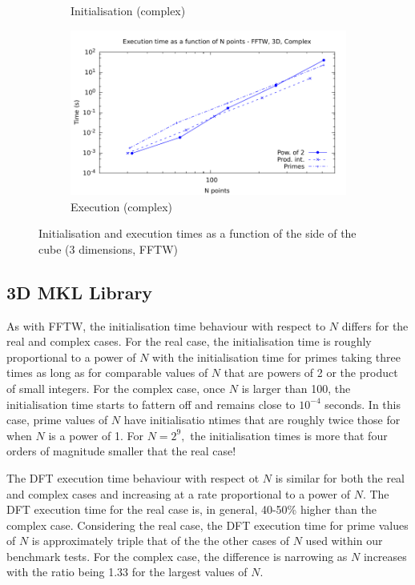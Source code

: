 \documentclass[12pt, a4paper]{article} \setlength{\textheight}{24cm}
\begin{document}
\begin{figure}[H]
\begin{subfigure}{.5\textwidth}
    \caption{Initialisation (complex)}
    \label{3DFFTWCI}
  \end{subfigure}%
  \begin{subfigure}{.5\textwidth}
    \centering
    \includegraphics[width=.9\linewidth]{graphs/3d-fftw-exec-c.pdf}
    \caption{Execution (complex)}
    \label{3DFFTWC}
  \end{subfigure}
  \caption{Initialisation and execution times as a function of the
    side of the cube (3 dimensions, FFTW)}
  \label{3DFFTW}
\end{figure}


\subsection{3D MKL Library}
As with FFTW, the initialisation time behaviour with respect to $N$
differs for the real and complex cases. For the real case, the
initialisation time is roughly proportional to a power of $N$ with the
initialisation time for primes taking three times as long as for
comparable values of $N$ that are powers of 2 or the product of small
integers. For the complex case, once $N$ is larger than 100, the
initialisation time starts to fattern off and remains close to
$10^{-4}$ seconds. In this case, prime values of $N$ have
initialisatio ntimes that are roughly twice those for when $N$ is a
power of 1. For $N=2^9,$ the initialisation times is more that four
orders of magnitude smaller that the real case!

The DFT execution time behaviour with respect ot $N$ is similar for both the real and complex cases and increasing at a rate proportional to a power of $N.$ The DFT execution time for the real case is, in general, 40-50\% higher than the complex case. Considering the real case, the DFT execution time for prime values of $N$ is approximately triple that of the the other cases of $N$ used within our benchmark tests. For the complex case, the difference is narrowing as $N$ increases with the ratio being 1.33 for the largest values of $N.$ 
\end{document}
